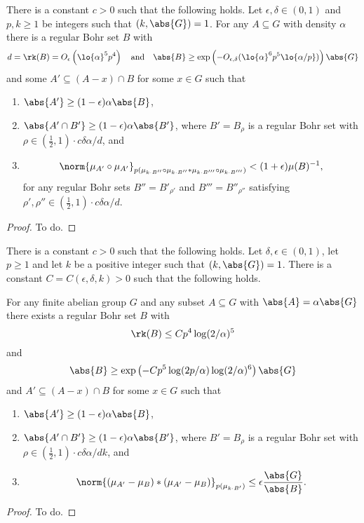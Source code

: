 \begin{theorem}
\label{flat-on-bohr}
There is a constant $c>0$ such that the following holds. Let ${\epsilon,\delta\in (0,1)}$ and $p,k\geq 1$ be integers such that $(k,\abs{G})=1$. For any $A\subseteq G$ with density $\alpha$ there is a regular Bohr set $B$ with
\[ d=\rk(B) =O_{\epsilon}\left(\lo{\alpha}^5p^4\right) \quad\text{and}\quad \abs{B}\geq \exp\left(-O_{\epsilon,\delta}(\lo{\alpha}^6p^5\lo{\alpha/p})\right)\abs{G} \]
and some $A'\subseteq (A-x)\cap B$ for some $x \in G$ such that
\begin{enumerate}
\item $\abs{A'}\geq (1-\epsilon)\alpha\abs{B}$,
\item $\abs{A'\cap B'}\geq (1-\epsilon)\alpha\abs{B'}$, where $B'=B_{\rho}$ is a regular Bohr set with ${\rho\in (\tfrac{1}{2},1)\cdot c\delta\alpha/d}$, and
\item
\[\norm{\mu_{A'}\circ \mu_{A'}}_{p(\mu_{k\cdot B''}\circ \mu_{k\cdot B''}\ast \mu_{k\cdot B'''}\circ \mu_{k\cdot B'''})} <(1+ \epsilon)\mu(B)^{-1},\]
for any regular Bohr sets $B'' = B'_{\rho'}$ and $B'''=B''_{\rho''}$ satisfying ${\rho',\rho''\in(\frac{1}{2},1)\cdot c\delta\alpha/d}$.
\end{enumerate}
\end{theorem}
\begin{proof}
To do.
\end{proof}

\begin{theorem}
\label{th-int-gen}
There is a constant $c>0$ such that the following holds. Let $\delta,\epsilon\in (0,1)$, let $p \geq 1$ and let $k$ be a positive integer such that $(k,\abs{G})=1$. There is a constant $C=C(\epsilon,\delta,k)>0$ such that the following holds.

For any finite abelian group $G$ and any subset $A\subseteq G$ with $\abs{A}=\alpha \abs{G}$ there exists a regular Bohr set $B$ with
\[\rk(B)\leq Cp^4\log(2/\alpha)^5\]
and
\[\abs{B}\geq \exp\left(-Cp^5\log(2p/\alpha)\log(2/\alpha)^6\right)\abs{G}\]
and $A' \subseteq (A-x)\cap B$ for some $x\in G$ such that
\begin{enumerate}
\item $\abs{A'}\geq (1-\epsilon)\alpha \abs{B}$,
\item $\abs{A'\cap B'}\geq (1-\epsilon)\alpha\abs{B'}$, where $B'=B_{\rho}$ is a regular Bohr set with $\rho\in (\tfrac{1}{2},1)\cdot c\delta\alpha/dk$, and
\item
\[\norm{(\mu_{A'}-\mu_B)\ast (\mu_{A'}- \mu_B)}_{p(\mu_{k\cdot B'})} \leq \epsilon\frac{\abs{G}}{\abs{B}}.\]
\end{enumerate}
\end{theorem}
\begin{proof}
To do.
\end{proof}


